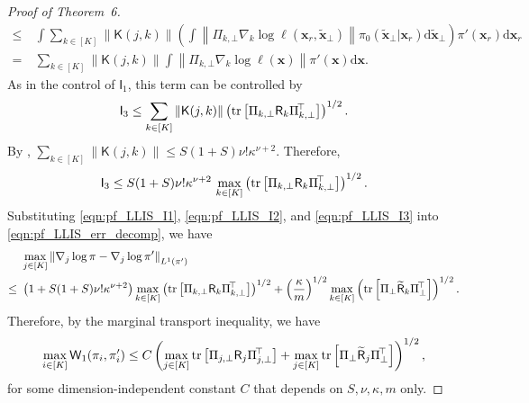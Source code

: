 \documentclass[10pt,a4paper]{amsart}
\newcommand{\Brac}[1]{\left(#1\right)}
\newcommand{\Rectbrac}[1]{\left[#1\right]}
\newcommand{\bx}{{\boldsymbol{x}}}
\newcommand{\matT}{^{\!\top}}
\newcommand{\mdd}{\mathrm{d}}
\newcommand{\norm}[1]{\left\|#1\right\|}
\newcommand{\sfI}{\mathsf{I}}
\newcommand{\sfK}{\mathsf{K}}
\newcommand{\sfR}{\mathsf{R}}
\newcommand{\sfW}{\mathsf{W}}
\newcommand{\tr}{\text{\rm tr}}
\begin{document}
\begin{proof}[Proof of Theorem~6]
\begin{align*}
    \le~& \int \sum_{k\in[K]} \norm{\sfK(j,k)} \Brac{ \int \norm{ \Pi_{k,\bot} \nabla_k \log \ell(\bx_r,\widetilde{\bx}_\bot) } \pi_0(\widetilde{\bx}_\bot|\bx_r) \mdd \widetilde{\bx}_\bot } \pi'(\bx_r) \mdd \bx_r \\
    =~& \sum_{k\in[K]} \norm{\sfK(j,k)} \int \norm{ \Pi_{k,\bot} \nabla_k \log \ell(\bx) } \pi'(\bx) \mdd \bx. 
\end{align*}
%
As in the control of $\sfI_1$, this term can be controlled by
\[
    \sfI_3 \le \sum_{k\in[K]} \norm{\sfK(j,k)} \Brac{ \tr \Rectbrac{ \Pi_{k,\bot} \sfR_k \Pi_{k,\bot}\matT } }^{1/2}.
\]
By , $\sum_{k\in[K]} \norm{\sfK(j,k)} \le S(1+S) \nu! \kappa^{\nu+2}$. Therefore,
\begin{equation}
\label{eqn:pf_LLIS_I3}
    \sfI_3 \le S(1+S) \nu! \kappa^{\nu+2}\, \max_{k\in[K]} \Brac{ \tr \Rectbrac{ \Pi_{k,\bot} \sfR_k \Pi_{k,\bot}\matT } }^{1/2}.
\end{equation}
Substituting \eqref{eqn:pf_LLIS_I1}, \eqref{eqn:pf_LLIS_I2}, and \eqref{eqn:pf_LLIS_I3} into \eqref{eqn:pf_LLIS_err_decomp}, we have
\begin{align*}
    & \max_{j\in[K]} \norm{ \nabla_j \log \pi - \nabla_j \log \pi' }_{L^1(\pi')} \\
    \le~& \Brac{ 1 + S(1+S) \nu! \kappa^{\nu+2} } \max_{k\in[K]} \Brac{ \tr \Rectbrac{ \Pi_{k,\bot} \sfR_k \Pi_{k,\bot}\matT } }^{1/2} + \Brac{\frac{\kappa}{m}}^{1/2} \max_{k\in[K]} \Brac{ \tr \Rectbrac{ \Pi_\bot \widetilde{\sfR}_k \Pi_\bot\matT } }^{1/2}.
\end{align*}
Therefore, by the marginal transport inequality, we have 
\[
    \max_{i\in[K]} \sfW_1(\pi_i,\pi_i') \le C \Brac{ \max_{j\in[K]} \tr \Rectbrac{ \Pi_{j,\bot} \sfR_j \Pi_{j,\bot}\matT } + \max_{j\in[K]}  \tr \Rectbrac{ \Pi_\bot \widetilde{\sfR}_j \Pi_\bot\matT } }^{1/2},
\]
for some dimension-independent constant $C$ that depends on $S,\nu,\kappa,m$ only.
\end{proof}
\end{document}

